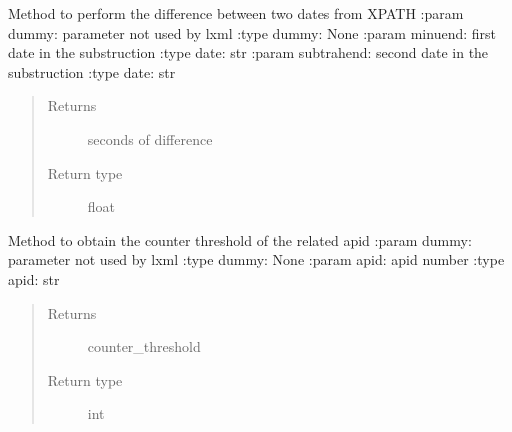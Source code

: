 \begin{fulllineitems}
\label{\detokenize{s2boa.ingestions:s2boa.ingestions.xpath_functions.dates_difference}}
\sphinxAtStartPar
Method to perform the difference between two dates from XPATH
:param dummy: parameter not used by lxml
:type dummy: None
:param minuend: first date in the substruction
:type date: str
:param subtrahend: second date in the substruction
:type date: str
\begin{quote}\begin{description}
\item[{Returns}] \leavevmode
\sphinxAtStartPar
seconds of difference

\item[{Return type}] \leavevmode
\sphinxAtStartPar
float

\end{description}\end{quote}

\end{fulllineitems}


\begin{fulllineitems}
\label{\detokenize{s2boa.ingestions:s2boa.ingestions.xpath_functions.get_counter_threshold_from_apid}}
\sphinxAtStartPar
Method to obtain the counter threshold of the related apid
:param dummy: parameter not used by lxml
:type dummy: None
:param apid: apid number
:type apid: str
\begin{quote}\begin{description}
\item[{Returns}] \leavevmode
\sphinxAtStartPar
counter\_threshold

\item[{Return type}] \leavevmode
\sphinxAtStartPar
int

\end{description}\end{quote}

\end{fulllineitems}

